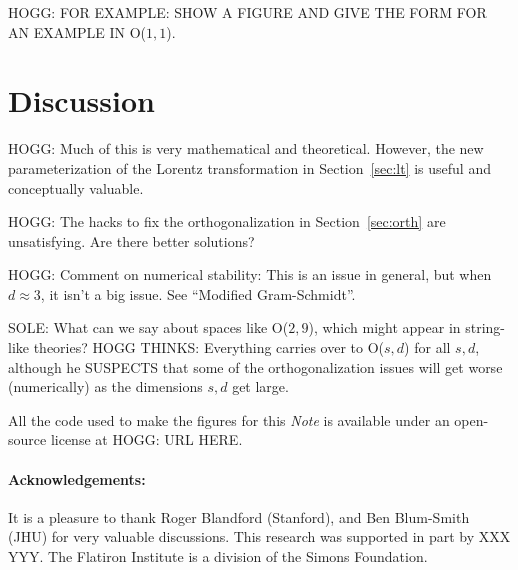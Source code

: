 \documentclass{article}
\newcommand{\documentname}{\textsl{Note}}
\newcommand{\secref}[1]{Section~\ref{#1}}
\begin{document}
HOGG: FOR EXAMPLE: SHOW A FIGURE AND GIVE THE FORM FOR AN EXAMPLE IN O($1,1$).

\section{Discussion}\label{sec:discussion}

HOGG: Much of this is very mathematical and theoretical.
However, the new parameterization of the Lorentz transformation in \secref{sec:lt} is useful and conceptually valuable.

HOGG: The hacks to fix the orthogonalization in \secref{sec:orth} are unsatisfying. Are there better solutions?

HOGG: Comment on numerical stability: This is an issue in general, but when $d\approx 3$, it isn't a big issue. See ``Modified Gram-Schmidt''.

SOLE: What can we say about spaces like O($2,9$), which might appear in string-like theories?
HOGG THINKS: Everything carries over to O($s,d$) for all $s,d$, although he SUSPECTS that some of the orthogonalization issues will get worse (numerically) as the dimensions $s,d$ get large.

All the code used to make the figures for this \documentname{} is available under an open-source license at HOGG: URL HERE.

\paragraph{Acknowledgements:}
It is a pleasure to thank
  Roger Blandford (Stanford), and
  Ben Blum-Smith (JHU)
for very valuable discussions.
This research was supported in part by XXX YYY.
The Flatiron Institute is a division of the Simons Foundation.

\raggedright
\printbibliography
\end{document}
